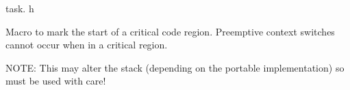 task. h

Macro to mark the start of a critical code region. Preemptive context switches cannot occur when in a critical region.

N\-O\-T\-E\-: This may alter the stack (depending on the portable implementation) so must be used with care! 
